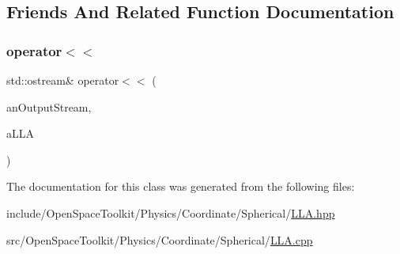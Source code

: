 \subsection{Friends And Related Function Documentation}
\mbox{\label{classostk_1_1physics_1_1coord_1_1spherical_1_1_l_l_a_a4e052cf41d11b11c943ad32cd4c25ba8}} 
\subsubsection{\texorpdfstring{operator$<$$<$}{operator<<}}
{\footnotesize\ttfamily std\+::ostream\& operator$<$$<$ (\begin{DoxyParamCaption}\item[{std\+::ostream \&}]{an\+Output\+Stream,  }\item[{const \hyperlink{classostk_1_1physics_1_1coord_1_1spherical_1_1_l_l_a}{L\+LA} \&}]{a\+L\+LA }\end{DoxyParamCaption})\hspace{0.3cm}{\ttfamily [friend]}}



The documentation for this class was generated from the following files\+:\begin{DoxyCompactItemize}
\item 
include/\+Open\+Space\+Toolkit/\+Physics/\+Coordinate/\+Spherical/\hyperlink{_l_l_a_8hpp}{L\+L\+A.\+hpp}\item 
src/\+Open\+Space\+Toolkit/\+Physics/\+Coordinate/\+Spherical/\hyperlink{_l_l_a_8cpp}{L\+L\+A.\+cpp}\end{DoxyCompactItemize}
